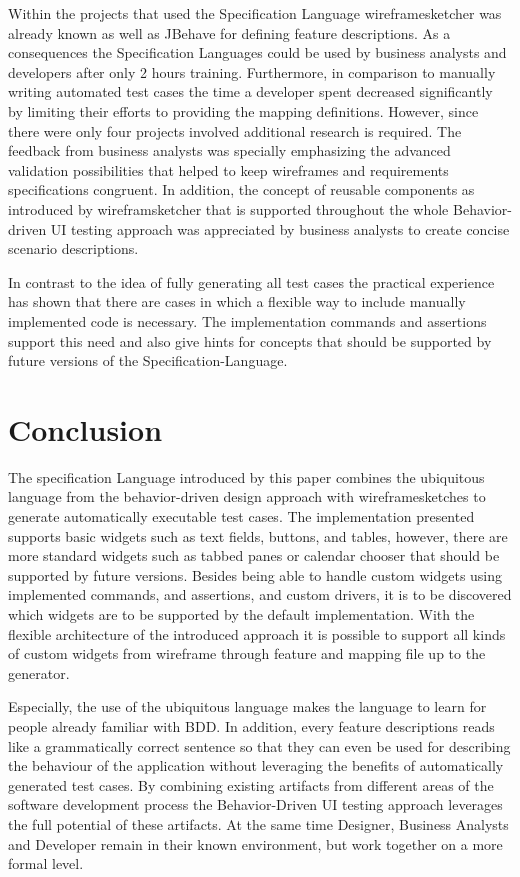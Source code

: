 \documentclass{sig-alternate-05-2015}
\begin{document}
Within the projects that used the Specification Language wireframesketcher was already known as well as JBehave for defining feature descriptions.
As a consequences the Specification Languages could be used by business analysts and developers after only 2 hours training.
Furthermore, in comparison to manually writing automated test cases the time a developer spent decreased significantly by limiting their efforts to providing the mapping definitions.
However, since there were only four projects involved additional research is required.
The feedback from business analysts was specially emphasizing the advanced validation possibilities that helped to keep wireframes and requirements specifications congruent.
In addition, the concept of reusable components as introduced by wireframsketcher that is supported throughout the whole Behavior-driven UI testing approach was appreciated by business analysts to create concise scenario descriptions.
 
In contrast to the idea of fully generating all test cases the practical experience has shown that there are cases in which a flexible way to include manually implemented code is necessary. 
The implementation commands and assertions support this need and also give hints for concepts that should be supported by future versions of the Specification-Language.


\section{Conclusion}\label{sec:Conclusion} %
The specification Language introduced by this paper combines the ubiquitous language from the behavior-driven design approach with wireframesketches to generate automatically executable test cases.
The implementation presented supports basic widgets such as text fields, buttons, and tables, however, there are more standard widgets such as tabbed panes or calendar chooser that should be supported by future versions.
Besides being able to handle custom widgets using implemented commands, and assertions, and custom drivers, it is to be discovered which widgets are to be supported by the default implementation.
With the flexible architecture of the introduced approach it is possible to support all kinds of custom widgets from wireframe through feature and mapping file up to the generator.

Especially, the use of the ubiquitous language makes the language to learn for people already familiar with BDD. 
In addition, every feature descriptions reads like a grammatically correct sentence so that they can even be used for describing the behaviour of the application without leveraging the benefits of automatically generated test cases.
By combining existing artifacts from different areas of the software development process the Behavior-Driven UI testing approach leverages the full potential of these artifacts.
At the same time Designer, Business Analysts and Developer remain in their known environment, but work together on a more formal level. 
\end{document}
